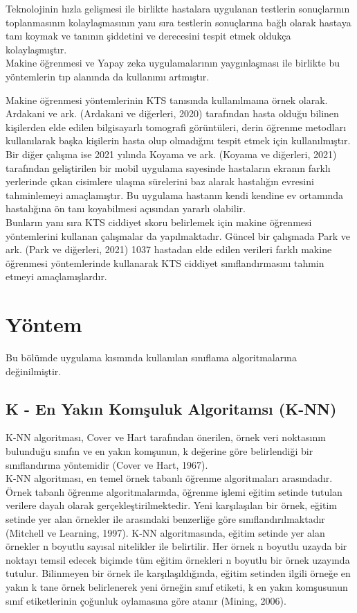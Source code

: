 \documentclass[12pt,twoside]{deuthesis}
\begin{document}
Teknolojinin hızla gelişmesi ile birlikte hastalara uygulanan testlerin sonuçlarının toplanmasının kolaylaşmasının yanı sıra testlerin sonuçlarına bağlı olarak hastaya tanı koymak ve tanının şiddetini ve derecesini tespit etmek oldukça kolaylaşmıştır.\\
Makine öğrenmesi ve Yapay zeka uygulamalarının yaygınlaşması ile birlikte bu yöntemlerin tıp alanında da kullanımı artmıştır.

Makine öğrenmesi yöntemlerinin KTS tanısında kullanılmaına örnek olarak.
Ardakani ve ark. (Ardakani ve diğerleri, 2020) tarafından hasta olduğu bilinen kişilerden elde edilen bilgisayarlı tomografi görüntüleri, derin öğrenme metodları kullanılarak başka kişilerin hasta olup olmadığını tespit etmek için kullanılmıştır.\\
Bir diğer çalışma ise 2021 yılında Koyama ve ark. (Koyama ve diğerleri, 2021) tarafından geliştirilen bir mobil uygulama sayesinde hastaların ekranın farklı yerlerinde çıkan cisimlere ulaşma sürelerini baz alarak hastalığın evresini tahminlemeyi amaçlamıştır. Bu uygulama hastanın kendi kendine ev ortamında hastalığına ön tanı koyabilmesi açısından yararlı olabilir.\\
Bunların yanı sıra KTS ciddiyet skoru belirlemek için makine öğrenmesi yöntemlerini kullanan çalışmalar da yapılmaktadır.
Güncel bir çalışmada Park ve ark. (Park ve diğerleri, 2021) 1037 hastadan elde edilen verileri farklı makine öğrenmesi yöntemlerinde kullanarak KTS ciddiyet sınıflandırmasını tahmin etmeyi amaçlamışlardır.

\hypertarget{yontem}{%
\chapter{Yöntem}\label{yontem}}

Bu bölümde uygulama kısmında kullanılan sınıflama algoritmalarına değinilmiştir.

\hypertarget{knn}{%
\section{K - En Yakın Komşuluk Algoritamsı (K-NN)}\label{knn}}

K-NN algoritması, Cover ve Hart tarafından önerilen, örnek veri noktasının bulunduğu sınıfın ve en yakın komşunun, k değerine göre belirlendiği bir sınıflandırma yöntemidir (Cover ve Hart, 1967).\\
K-NN algoritması, en temel örnek tabanlı öğrenme algoritmaları arasındadır. Örnek tabanlı öğrenme algoritmalarında, öğrenme işlemi eğitim setinde tutulan verilere dayalı olarak gerçekleştirilmektedir. Yeni karşılaşılan bir örnek, eğitim setinde yer alan örnekler ile arasındaki benzerliğe göre sınıflandırılmaktadır (Mitchell ve Learning, 1997). K-NN algoritmasında, eğitim setinde yer alan örnekler n boyutlu sayısal nitelikler ile belirtilir. Her örnek n boyutlu uzayda bir noktayı temsil edecek biçimde tüm eğitim örnekleri n boyutlu bir örnek uzayında tutulur. Bilinmeyen bir örnek ile karşılaşıldığında, eğitim setinden ilgili örneğe en yakın k tane örnek belirlenerek yeni örneğin sınıf etiketi, k en yakın komşusunun sınıf etiketlerinin çoğunluk oylamasına göre atanır (Mining, 2006).
\end{document}
